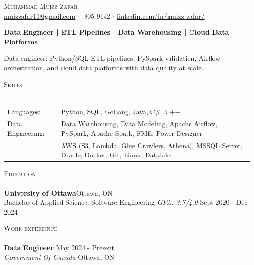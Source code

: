 \documentclass[a4paper]{article}
\newcommand{\lineunder} {
    \vspace*{-8pt} \\
    \hspace*{-18pt} \hrulefill \\
}
\newcommand{\header} [1] {
    {\hspace*{-18pt}\vspace*{6pt} \textsc{#1}}
    \vspace*{-6pt} \lineunder
}
\begin{document}
\vspace*{-40pt}
\vspace*{-10pt}
\begin{center}
	{\Huge \scshape {Muhammad Muizz Zafar}}\\
	\faSend \space \href{mailto:muizzafar11@gmail.com}{muizzafar11@gmail.com} $\cdot$ \faPhoneSquare {}-805-9142 $\cdot$ \faLinkedinSquare \space \href{https://www.linkedin.com/in/muizz-zafar/}{linkedin.com/in/muizz-zafar/}
	\\
\end{center}
\vspace{-5pt}
\begin{center}
\textbf{Data Engineer | ETL Pipelines | Data Warehousing | Cloud Data Platforms}
\end{center}
\begin{center}
Data engineer: Python/SQL ETL pipelines, PySpark validation, Airflow orchestration, and cloud data platforms with data quality at scale.
\end{center}
\header{Skills}
\begin{tabular}{ l l }
	Languages: & Python, SQL, GoLang, Java, C\#, C++ \\
Data Engineering: & Data Warehousing, Data Modeling, Apache Airflow, PySpark, Apache Spark, FME, Power Designer\\
& AWS (S3, Lambda, Glue Crawlers, Athena), MSSQL Server, Oracle, Docker, Git, Linux, Datalake
\end{tabular}
\header{Education}
\textbf{University of Ottawa}\hfill Ottawa, ON\\
Bachelor of Applied Science, Software Engineering \textit{GPA: 3.7/4.0} \hfill Sept 2020 - Dec 2024\\
\vspace{1mm}
\header{Work experience}
\vspace{1.5mm}
\textbf{Data Engineer} \hfill May 2024 - Present\\
\textit{Government Of Canada} \hfill Ottawa, ON\\
\vspace{-2mm}
\end{document}
